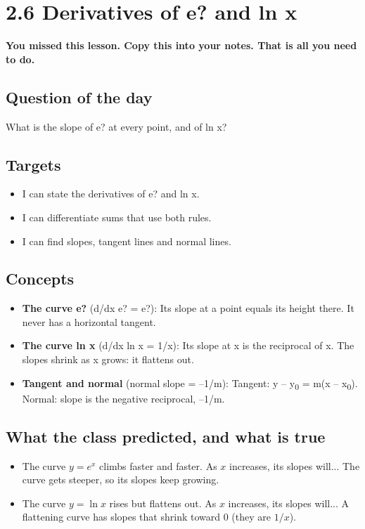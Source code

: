 \documentclass[11pt]{article}
\begin{document}
\section*{2.6 Derivatives of e? and ln x}
\textbf{You missed this lesson. Copy this into your notes. That is all you need to do.}\par\medskip
\subsection*{Question of the day}
What is the slope of e? at every point, and of ln x?\par
\subsection*{Targets}\begin{itemize}\item I can state the derivatives of e? and ln x.
\item I can differentiate sums that use both rules.
\item I can find slopes, tangent lines and normal lines.\end{itemize}
\subsection*{Concepts}\begin{itemize}
\item \textbf{The curve e?} (d/dx e? = e?): Its slope at a point equals its height there. It never has a horizontal tangent.
\item \textbf{The curve ln x} (d/dx ln x = 1/x): Its slope at x is the reciprocal of x. The slopes shrink as x grows: it flattens out.
\item \textbf{Tangent and normal} (normal slope = --1/m): Tangent: y -- y\textsubscript{0} = m(x -- x\textsubscript{0}). Normal: slope is the negative reciprocal, --1/m.
\end{itemize}
\subsection*{What the class predicted, and what is true}\begin{itemize}
\item The curve $y=e^x$ climbs faster and faster. As $x$ increases, its slopes will...  The curve gets steeper, so its slopes keep growing.
\item The curve $y=\ln x$ rises but flattens out. As $x$ increases, its slopes will...  A flattening curve has slopes that shrink toward 0 (they are $1/x$).
\end{itemize}
\end{document}
